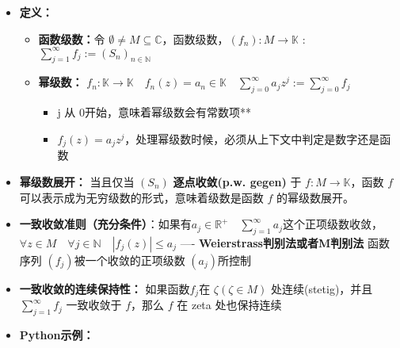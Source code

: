 \documentclass[a4paper,12pt]{article}
\begin{document}
\begin{itemize}
\item
  \textbf{定义：}

  \begin{itemize}
  \item
    \textbf{函数级数：}令
    \(\emptyset \neq M \subseteq \mathbb{C}\)，函数级数，\((f_n): M \to \mathbb{K}\)
    : \(\sum_{j=1}^\infty f_j := (S_n)_{n \in \mathbb{N}}\)
  \item
    \textbf{幂级数：}
    \(f_n:\mathbb{K} \to \mathbb{K}\quad f_n(z) = a_n \in \mathbb{K}\quad\sum_{j=0}^\infty a_jz^j := \sum_{j = 0}^\infty f_j\)

    \begin{itemize}
    \item
      j 从 0开始，意味着幂级数会有常数项**
    \item
      \(f_j(z) = a_jz^j\)，处理幂级数时候，必须从上下文中判定是数字还是函数
    \end{itemize}
  \end{itemize}
\item
  \textbf{幂级数展开：} 当且仅当 \((S_n)\) \textbf{逐点收敛(p.w. gegen)}
  于 \(f:M \to \mathbb{K}\)，函数 \(f\)
  可以表示成为无穷级数的形式，意味着级数是函数 \(f\) 的幂级数展开。
\item
  \textbf{一致收敛准则（充分条件）}：如果有\(a_j \in \mathbb{R}^+\quad\sum_{j=1}^\infty a_j\)这个正项级数收敛，\(\forall z \in M\quad\forall j \in \mathbb{N}\quad|f_j(z)| \leq a_j\)
  ---- \textbf{Weierstrass判别法或者M判别法} 函数序列
  \((f_j)\)被一个收敛的正项级数 \((a_j)\)所控制
\item
  \textbf{一致收敛的连续保持性：} 如果函数\(f_j\)在
  \(\zeta(\zeta \in M)\) 处连续(stetig)，并且\(\sum_{j = 1}^\infty f_j\)
  一致收敛于 \(f\)，那么 \(f\) 在 zeta 处也保持连续
\item
  \textbf{Python示例：}
\end{itemize}
\end{document}
